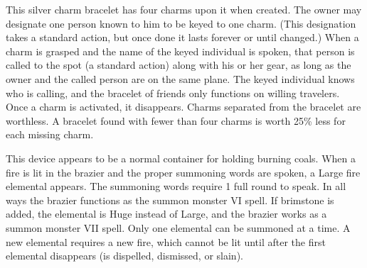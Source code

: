 { This silver charm bracelet has four charms upon it when created. The owner may designate one person known to him to be keyed to one charm. (This designation takes a standard action, but once done it lasts forever or until changed.) When a charm is grasped and the name of the keyed individual is spoken, that person is called to the spot (a standard action) along with his or her gear, as long as the owner and the called person are on the same plane. The keyed individual knows who is calling, and the bracelet of friends only functions on willing travelers. Once a charm is activated, it disappears. Charms separated from the bracelet are worthless. A bracelet found with fewer than four charms is worth 25\% less for each missing charm.


 This device appears to be a normal container for holding burning coals. When a fire is lit in the brazier and the proper summoning words are spoken, a Large fire elemental appears. The summoning words require 1 full round to speak. In all ways the brazier functions as the summon monster VI spell. If brimstone is added, the elemental is Huge instead of Large, and the brazier works as a summon monster VII spell. Only one elemental can be summoned at a time. A new elemental requires a new fire, which cannot be lit until after the first elemental disappears (is dispelled, dismissed, or slain).


\begin{comment}
Brooch of Shielding:} This appears to be a piece of silver or gold jewelry used to fasten a cloak or cape. In addition to this mundane task, it can absorb magic missiles of the sort generated by spell or spell-like ability. A brooch can absorb up to 101 points of damage from magic missiles before it melts and becomes useless.

Faint abjuration; CL 1st; Craft Wondrous Item, shield; Price 1,500 gp.

Broom of Flying:} This broom is able to fly through the air as if affected by an overland flight spell (average maneuverability) for up to 9 hours per day (split up as its owner desires). The broom can carry 200 pounds and fly at a speed of 40 feet, or up to 400 pounds at a speed at 30 feet. In addition, the broom can travel alone to any destination named by the owner as long as she has a good idea of the location and layout of that destination. It comes to its owner from as far away as 300 yards when she speaks the command word. The broom of flying has a speed of 40 feet when it has no rider.


\end{comment}}
